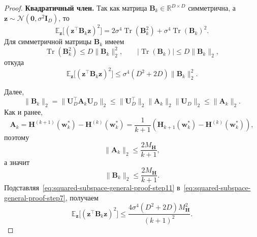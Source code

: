 \begin{proof}
    \textbf{Квадратичный член.}
    Так как матрица $\mathbf B_k \in \mathbb R^{D\times D}$ симметрична, а
    $\mathbf z \sim \mathcal N(\mathbf 0, \sigma^2\mathbf I_D)$, то
    \begin{equation}
        \label{eq:squared-subspace-general-proof-step6}
        \mathbb E_{\mathbf z}\big[(\mathbf z^\top \mathbf B_k \mathbf z)^2\big]
        =
        2\sigma^4 \operatorname{Tr}(\mathbf B_k^2)
        +
        \sigma^4 \operatorname{Tr}(\mathbf B_k)^2.
    \end{equation}
    Для симметричной матрицы $\mathbf B_k$ имеем
    \begin{equation}
        \operatorname{Tr}(\mathbf B_k^2)\leqslant D\|\mathbf B_k\|_2^2,
        \qquad
        |\operatorname{Tr}(\mathbf B_k)|\leqslant D\|\mathbf B_k\|_2,
    \end{equation}
    откуда
    \begin{equation}
        \label{eq:squared-subspace-general-proof-step7}
        \mathbb E_{\mathbf z}\big[(\mathbf z^\top \mathbf B_k \mathbf z)^2\big]
        \leqslant
        \sigma^4(D^2+2D)\|\mathbf B_k\|_2^2.
    \end{equation}

    Далее,
    \begin{equation}
        \label{eq:squared-subspace-general-proof-step8}
        \|\mathbf B_k\|_2
        =
        \|\mathbf U_D^\top \mathbf A_k \mathbf U_D\|_2
        \leqslant
        \|\mathbf U_D^\top\|_2 \|\mathbf A_k\|_2 \|\mathbf U_D\|_2
        \leqslant
        \|\mathbf A_k\|_2.
    \end{equation}
    Как и ранее,
    \begin{equation}
        \label{eq:squared-subspace-general-proof-step9}
        \mathbf A_k
        =
        \mathbf H^{(k+1)}(\mathbf w_k^*)
        -
        \mathbf H^{(k)}(\mathbf w_k^*)
        =
        \frac{1}{k+1}
        \left(
            \mathbf H_{k+1}(\mathbf w_k^*)
            -
            \mathbf H^{(k)}(\mathbf w_k^*)
        \right),
    \end{equation}
    поэтому
    \begin{equation}
        \label{eq:squared-subspace-general-proof-step10}
        \|\mathbf A_k\|_2
        \leqslant
        \frac{2M_{\mathbf H}}{k+1},
    \end{equation}
    а значит
    \begin{equation}
        \label{eq:squared-subspace-general-proof-step11}
        \|\mathbf B_k\|_2
        \leqslant
        \frac{2M_{\mathbf H}}{k+1}.
    \end{equation}
    Подставляя~\eqref{eq:squared-subspace-general-proof-step11}
    в~\eqref{eq:squared-subspace-general-proof-step7}, получаем
    \begin{equation}
        \label{eq:squared-subspace-general-proof-step12}
        \mathbb E_{\mathbf z}\big[(\mathbf z^\top \mathbf B_k \mathbf z)^2\big]
        \leqslant
        \frac{4\sigma^4(D^2+2D)M_{\mathbf H}^2}{(k+1)^2}.
    \end{equation}


\end{proof}
